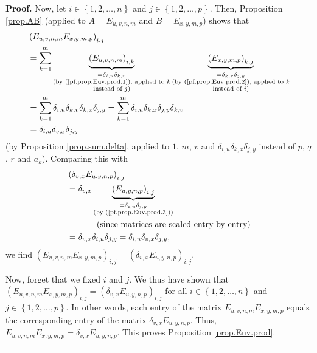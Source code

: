 \documentclass[numbers=enddot,12pt,final,onecolumn,notitlepage]{scrartcl}%
\theoremstyle{definition}
\newenvironment{proof}[1][Proof]{\noindent\textbf{#1.} }{\ \rule{0.5em}{0.5em}}
\let\sumnonlimits\sum
\renewcommand{\sum}{\sumnonlimits\limits}
\begin{document}
\begin{proof}
Now, let $i\in\left\{  1,2,\ldots,n\right\}  $ and $j\in\left\{
1,2,\ldots,p\right\}  $. Then, Proposition \ref{prop.AB} (applied to
$A=E_{u,v,n,m}$ and $B=E_{x,y,m,p}$) shows that%
\begin{align*}
&  \left(  E_{u,v,n,m}E_{x,y,m,p}\right)  _{i,j}\\
&  =\sum_{k=1}^{m}\underbrace{\left(  E_{u,v,n,m}\right)  _{i,k}%
}_{\substack{=\delta_{i,u}\delta_{k,v}\\\text{(by (\ref{pf.prop.Euv.prod.1}),
applied to }k\\\text{instead of }j\text{)}}}\underbrace{\left(  E_{x,y,m,p}%
\right)  _{k,j}}_{\substack{=\delta_{k,x}\delta_{j,y}\\\text{(by
(\ref{pf.prop.Euv.prod.2}), applied to }k\\\text{instead of }i\text{)}}}\\
&  =\sum_{k=1}^{m}\delta_{i,u}\delta_{k,v}\delta_{k,x}\delta_{j,y}=\sum
_{k=1}^{m}\delta_{i,u}\delta_{k,x}\delta_{j,y}\delta_{k,v}\\
&  =\delta_{i,u}\delta_{v,x}\delta_{j,y}%
\end{align*}
(by Proposition \ref{prop.sum.delta}, applied to $1$, $m$, $v$ and
$\delta_{i,u}\delta_{k,x}\delta_{j,y}$ instead of $p$, $q$, $r$ and $a_{k}$).
Comparing this with%
\begin{align*}
&  \left(  \delta_{v,x}E_{u,y,n,p}\right)  _{i,j}\\
&  =\delta_{v,x}\underbrace{\left(  E_{u,y,n,p}\right)  _{i,j}}%
_{\substack{=\delta_{i,u}\delta_{j,y}\\\text{(by (\ref{pf.prop.Euv.prod.3}))}%
}}\\
&  \ \ \ \ \ \ \ \ \ \ \left(  \text{since matrices are scaled entry by
entry}\right) \\
&  =\delta_{v,x}\delta_{i,u}\delta_{j,y}=\delta_{i,u}\delta_{v,x}\delta_{j,y},
\end{align*}
we find $\left(  E_{u,v,n,m}E_{x,y,m,p}\right)  _{i,j}=\left(  \delta
_{v,x}E_{u,y,n,p}\right)  _{i,j}$.

Now, forget that we fixed $i$ and $j$. We thus have shown that $\left(
E_{u,v,n,m}E_{x,y,m,p}\right)  _{i,j}=\left(  \delta_{v,x}E_{u,y,n,p}\right)
_{i,j}$ for all $i\in\left\{  1,2,\ldots,n\right\}  $ and $j\in\left\{
1,2,\ldots,p\right\}  $. In other words, each entry of the matrix
$E_{u,v,n,m}E_{x,y,m,p}$ equals the corresponding entry of the matrix
$\delta_{v,x}E_{u,y,n,p}$. Thus, $E_{u,v,n,m}E_{x,y,m,p}=\delta_{v,x}%
E_{u,y,n,p}$. This proves Proposition \ref{prop.Euv.prod}.
\end{proof}
\end{document}
